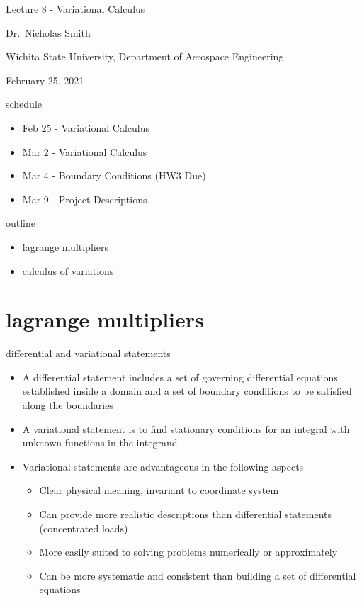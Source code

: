 \documentclass[12pt,handout]{beamer}
\providecommand{\tightlist}{%
  \setlength{\itemsep}{0pt}\setlength{\parskip}{0pt}}
\providecommand{\tightlist}{%
\setlength{\itemsep}{0pt}\setlength{\parskip}{0pt}}
\begin{document}
\begin{frame}
Lecture 8 - Variational Calculus

Dr.~Nicholas Smith

Wichita State University, Department of Aerospace Engineering

February 25, 2021
\end{frame}

\begin{frame}{schedule}
\protect\hypertarget{schedule}{}
\begin{itemize}
\tightlist
\item
  Feb 25 - Variational Calculus
\item
  Mar 2 - Variational Calculus
\item
  Mar 4 - Boundary Conditions (HW3 Due)
\item
  Mar 9 - Project Descriptions
\end{itemize}
\end{frame}

\begin{frame}{outline}
\protect\hypertarget{outline}{}
\begin{itemize}
\tightlist
\item
  lagrange multipliers
\item
  calculus of variations
\end{itemize}
\end{frame}

\hypertarget{lagrange-multipliers}{%
\section{lagrange multipliers}\label{lagrange-multipliers}}

\begin{frame}{differential and variational statements}
\protect\hypertarget{differential-and-variational-statements}{}
\begin{itemize}
\tightlist
\item
  A differential statement includes a set of governing differential
  equations established inside a domain and a set of boundary conditions
  to be satisfied along the boundaries
\item
  A variational statement is to find stationary conditions for an
  integral with unknown functions in the integrand
\item
  Variational statements are advantageous in the following aspects

  \begin{itemize}
  \tightlist
  \item
    Clear physical meaning, invariant to coordinate system
  \item
    Can provide more realistic descriptions than differential statements
    (concentrated loads)
  \item
    More easily suited to solving problems numerically or approximately
  \item
    Can be more systematic and consistent than building a set of
    differential equations
  \end{itemize}
\end{itemize}
\end{frame}
\end{document}

